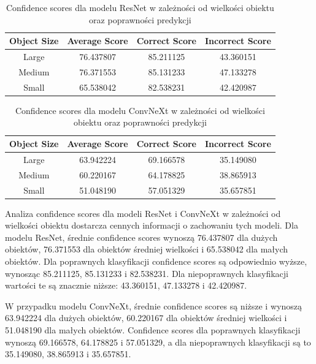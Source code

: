 \begin{table}
	\centering
	\begin{tabular}{|c|c|c|c|}
		\hline
		\textbf{Object Size} & \textbf{Average Score} & \textbf{Correct Score} & \textbf{Incorrect Score} \\
		\hline
		Large & 76.437807 & 85.211125 & 43.360151 \\
		\hline
		Medium & 76.371553 & 85.131233 & 47.133278 \\
		\hline
		Small & 65.538042 & 82.538231 & 42.420987 \\
		\hline
	\end{tabular}
	\caption{Confidence scores dla modelu ResNet w zależności od wielkości obiektu oraz poprawności predykcji}
	\label{tab:resnet_confidence_scores}
\end{table}

\begin{table}
	\centering
	\begin{tabular}{|c|c|c|c|}
		\hline
		\textbf{Object Size} & \textbf{Average Score} & \textbf{Correct Score} & \textbf{Incorrect Score} \\
		\hline
		Large & 63.942224 & 69.166578 & 35.149080 \\
		\hline
		Medium & 60.220167 & 64.178825 & 38.865913 \\
		\hline
		Small & 51.048190 & 57.051329 & 35.657851 \\
		\hline
	\end{tabular}
	\caption{Confidence scores dla modelu ConvNeXt w zależności od wielkości obiektu oraz poprawności predykcji}
	\label{tab:convnext_confidence_scores}
\end{table}

Analiza confidence scores dla modeli ResNet i ConvNeXt w zależności od wielkości obiektu dostarcza cennych informacji o zachowaniu tych modeli. 
Dla modelu ResNet, średnie confidence scores wynoszą 76.437807 dla dużych obiektów, 76.371553 dla obiektów średniej wielkości i 65.538042 dla 
małych obiektów. Dla poprawnych klasyfikacji confidence scores są odpowiednio wyższe, wynosząc 85.211125, 85.131233 i 82.538231. Dla niepoprawnych 
klasyfikacji wartości te są znacznie niższe: 43.360151, 47.133278 i 42.420987.

W przypadku modelu ConvNeXt, średnie confidence scores są niższe i wynoszą 63.942224 dla dużych obiektów, 60.220167 dla obiektów średniej 
wielkości i 51.048190 dla małych obiektów. Confidence scores dla poprawnych klasyfikacji wynoszą 69.166578, 64.178825 i 57.051329, a dla 
niepoprawnych klasyfikacji są to 35.149080, 38.865913 i 35.657851.

